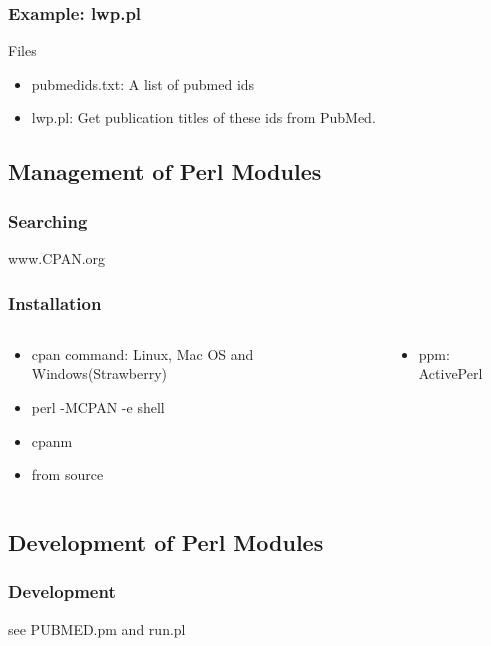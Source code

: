 \documentclass[UTF8]{beamer}
\begin{document}
\begin{frame}
  \frametitle{Example: lwp.pl}
\begin{block}{Files}
  \begin{itemize}
    \item pubmedids.txt: A list of pubmed ids
    \item lwp.pl: Get publication titles of these ids from PubMed.
  \end{itemize}
\end{block}
\end{frame}

\subsection{Management of Perl Modules}

\begin{frame}
  \frametitle{Searching}
  \centerline{www.CPAN.org}
\end{frame}

\begin{frame}
  \frametitle{Installation}
\begin{columns}
  \begin{column}{.5\textwidth}
    \begin{itemize}
      \item cpan command: Linux, Mac OS and Windows(Strawberry)
      \item perl -MCPAN -e shell
      \item cpanm
      \item from source
    \end{itemize}
  \end{column}
  \begin{column}{.5\textwidth}
    \begin{itemize}
      \item ppm: ActivePerl
    \end{itemize}
  \end{column}
\end{columns}
\end{frame}



\subsection{Development of Perl Modules}

\begin{frame}
  \frametitle{Development}
  see PUBMED.pm and run.pl
\end{frame}
\end{document}

